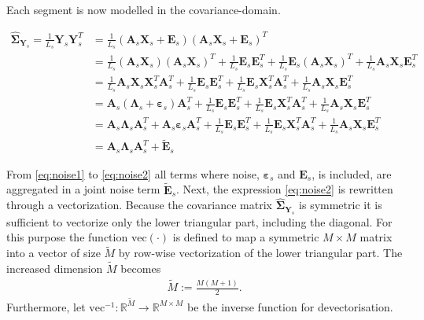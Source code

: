 Each segment is now modelled in the covariance-domain.
\begin{widepage}
\begin{align} 
\widehat{\boldsymbol{\Sigma}}_{\mathbf{Y}_s}= \frac{1}{L_s}\mathbf{Y}_s \mathbf{Y}_s^T &=  \frac{1}{L_s}\left( \mathbf{A}_s \mathbf{X}_s + \mathbf{E}_s \right) \left( \mathbf{A}_s \mathbf{X}_s + \mathbf{E}_s\right)^T \nonumber \\ 
&= \frac{1}{L_s} (\textbf{A}_s\textbf{X}_s)(\textbf{A}_s\textbf{X}_s)^T +\frac{1}{L_s}\textbf{E}_s \textbf{E}_s^T + \frac{1}{L_s}\textbf{E}_s (\textbf{A}_s\textbf{X}_s)^T + \frac{1}{L_s}\textbf{A}_s\textbf{X}_s \textbf{E}_s^T  \nonumber \\
&=\frac{1}{L_s} \textbf{A}_s\textbf{X}_s \textbf{X}_s^T \textbf{A}_s^T +\frac{1}{L_s} \textbf{E}_s \textbf{E}_s^T +\frac{1}{L_s} \textbf{E}_s \textbf{X}_s^T \textbf{A}_s^T +\frac{1}{L_s} \textbf{A}_s\textbf{X}_s \textbf{E}_s^T  \nonumber \\
&= \textbf{A}_s(\boldsymbol{\Lambda}_s +\boldsymbol{\varepsilon}_s) \textbf{A}_s^T +\frac{1}{L_s} \textbf{E}_s \textbf{E}_s^T + \frac{1}{L_s}\textbf{E}_s \textbf{X}_s^T \textbf{A}_s^T + \frac{1}{L_s}\textbf{A}_s\textbf{X}_s \textbf{E}_s^T \nonumber \\
&= \textbf{A}_s \boldsymbol{\Lambda}_s \textbf{A}_s^T + \textbf{A}_s \boldsymbol{\varepsilon}_s \textbf{A}_s^T + \frac{1}{L_s}\textbf{E}_s \textbf{E}_s^T +\frac{1}{L_s} \textbf{E}_s \textbf{X}_s^T \textbf{A}_s^T + \frac{1}{L_s}\textbf{A}_s\textbf{X}_s \textbf{E}_s^T \label{eq:noise1} \\
&= \textbf{A}_s \boldsymbol{\Lambda}_s \textbf{A}_s^T + \widetilde{\textbf{E}}_s \label{eq:noise2}
\end{align}
\end{widepage}
From \eqref{eq:noise1} to \eqref{eq:noise2} all terms where noise, $\boldsymbol{\varepsilon}_s$ and $\mathbf{E}_s$, is included, are aggregated in a joint noise term $\widetilde{\textbf{E}}_s$. 
Next, the expression \eqref{eq:noise2} is rewritten through a vectorization. 
Because the covariance matrix $\widehat{\boldsymbol{\Sigma}}_{\mathbf{Y}_s}$ is symmetric it is sufficient to vectorize only the lower triangular part, including the diagonal. 
For this purpose the function $\text{vec}(\cdot)$ is defined to map a symmetric $M \times M$ matrix into a vector of size $\widetilde{M}$ by row-wise vectorization of the lower triangular part. The increased dimension $\widetilde{M}$ becomes 
\begin{align}
\widetilde{M} := \frac{M(M+1)}{2}.
\end{align}
Furthermore, let $\text{vec}^{-1}: \mathbb{R}^{\widetilde{M}} \rightarrow \mathbb{R}^{M\times M}$ be the inverse function for devectorisation. 

